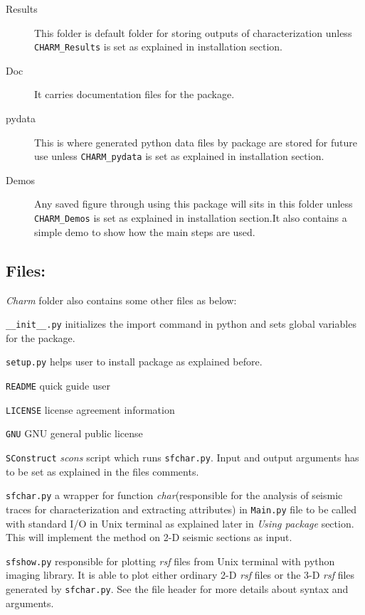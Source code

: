 \documentclass[12pt,titlepage]{article}
\begin{document}
\begin{description}
\item [Results] This folder is default folder for storing outputs of
  characterization unless \texttt{CHARM\_Results} is set as explained
  in installation section.

\item [Doc] It carries documentation files for the package.

\item [pydata] This is where generated python data files by package
  are stored for future use unless \texttt{CHARM\_pydata} is set as
  explained in installation section.

\item [Demos] Any saved figure through using this package will sits in
  this folder unless \texttt{CHARM\_Demos} is set as explained in
  installation section.It also contains a simple demo to show how
        the main steps are used.

\end{description}
%
%
\subsection*{Files:}
\textit{Charm} folder also contains some other files as below:
\begin{description}
\item \texttt{\_\_init\_\_.py} initializes the import command in
  python and sets global variables for the package.
\item  \texttt{setup.py} helps user to install package as explained before.
\item \texttt{README}  quick guide user 
\item \texttt{LICENSE} license agreement information
\item \texttt{GNU} GNU general public license
\item  \texttt{SConstruct} \textit{scons} script which runs \texttt{sfchar.py}. Input and output arguments has to be set as explained in the files comments.
\item \texttt{sfchar.py} a wrapper for function
  \textit{char}(responsible for the analysis of seismic traces for
  characterization and extracting attributes) in \texttt{Main.py} file
  to be called with standard I/O in Unix terminal as explained later
  in \textit{Using package} section. This will implement the method on
  2-D seismic sections as input.
\item  \texttt{sfshow.py} responsible for plotting \textit{rsf} files from Unix terminal with python imaging library. It is able to plot either ordinary 2-D \textit{rsf} files or the 3-D \textit{rsf} files generated by \texttt{sfchar.py}. See the file header for more details about syntax and arguments.
\end{description}
%
%
\end{document}
